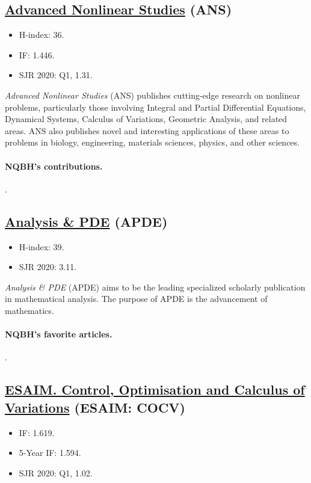 \documentclass{article}
\numberwithin{equation}{section}
\begin{document}
\subsection{\href{https://www.degruyter.com/journal/key/ans/html}{Advanced Nonlinear Studies} (ANS)}
\begin{itemize}
	\item H-index: 36.
	\item IF: 1.446.
	\item SJR 2020: Q1, 1.31.
\end{itemize}
\textit{Advanced Nonlinear Studies} (ANS) publishes cutting-edge research on nonlinear problems, particularly those involving Integral and Partial Differential Equations, Dynamical Systems, Calculus of Variations, Geometric Analysis, and related areas. ANS also publishes novel and interesting applications of these areas to problems in biology, engineering, materials sciences, physics, and other sciences.

\paragraph{NQBH's contributions.} \cite{Dao_Diaz_Nguyen2020}.

\subsection{\href{https://msp.org/apde}{Analysis \& PDE} (APDE)}
\begin{itemize}
	\item H-index: 39.
	\item SJR 2020: 3.11.
\end{itemize}
\textit{Analysis \& PDE} (APDE) aims to be the leading specialized scholarly publication in mathematical analysis. The purpose of APDE is the advancement of mathematics.

\paragraph{NQBH's favorite articles.} \cite{Tao2013}.

\subsection{\href{https://www.esaim-cocv.org/}{ESAIM. Control, Optimisation and Calculus of Variations} (ESAIM: COCV)}
\begin{itemize}
	\item IF: 1.619.
	\item 5-Year IF: 1.594.
	\item SJR 2020: Q1, 1.02.
\end{itemize}
\end{document}
